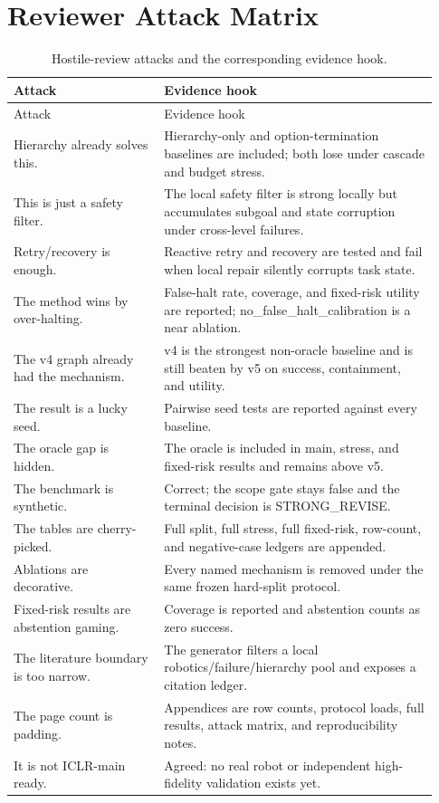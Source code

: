 \documentclass{article}
\begin{document}
\section{Reviewer Attack Matrix}
\begin{longtable}{@{}p{0.33\linewidth}p{0.60\linewidth}@{}}
\caption{Hostile-review attacks and the corresponding evidence hook.}\\
\toprule
Attack & Evidence hook\\
\midrule
\endfirsthead
\toprule
Attack & Evidence hook\\
\midrule
\endhead
Hierarchy already solves this. & Hierarchy-only and option-termination baselines are included; both lose under cascade and budget stress. \\
This is just a safety filter. & The local safety filter is strong locally but accumulates subgoal and state corruption under cross-level failures. \\
Retry/recovery is enough. & Reactive retry and recovery are tested and fail when local repair silently corrupts task state. \\
The method wins by over-halting. & False-halt rate, coverage, and fixed-risk utility are reported; no\_false\_halt\_calibration is a near ablation. \\
The v4 graph already had the mechanism. & v4 is the strongest non-oracle baseline and is still beaten by v5 on success, containment, and utility. \\
The result is a lucky seed. & Pairwise seed tests are reported against every baseline. \\
The oracle gap is hidden. & The oracle is included in main, stress, and fixed-risk results and remains above v5. \\
The benchmark is synthetic. & Correct; the scope gate stays false and the terminal decision is STRONG\_REVISE. \\
The tables are cherry-picked. & Full split, full stress, full fixed-risk, row-count, and negative-case ledgers are appended. \\
Ablations are decorative. & Every named mechanism is removed under the same frozen hard-split protocol. \\
Fixed-risk results are abstention gaming. & Coverage is reported and abstention counts as zero success. \\
The literature boundary is too narrow. & The generator filters a local robotics/failure/hierarchy pool and exposes a citation ledger. \\
The page count is padding. & Appendices are row counts, protocol loads, full results, attack matrix, and reproducibility notes. \\
It is not ICLR-main ready. & Agreed: no real robot or independent high-fidelity validation exists yet. \\
\bottomrule
\end{longtable}
\end{document}

